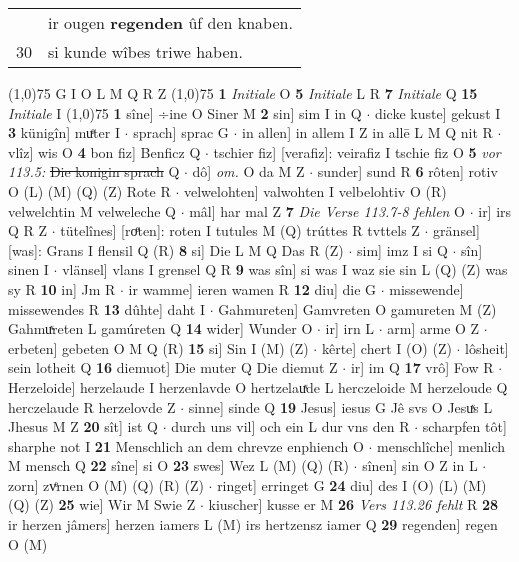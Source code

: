 \documentclass[8pt,a4paper,notitlepage]{article}
\begin{document}
\begin{table}[ht]
\begin{minipage}[t]{0.5\linewidth}
\begin{tabular}{rl}
 & ir ougen \textbf{regenden} ûf den knaben.\\ 
30 & si kunde wîbes triwe haben.\\ 
\end{tabular}
\scriptsize
\line(1,0){75} \newline
G I O L M Q R Z \newline
\line(1,0){75} \newline
\textbf{1} \textit{Initiale} O  \textbf{5} \textit{Initiale} L R  \textbf{7} \textit{Initiale} Q  \textbf{15} \textit{Initiale} I  \newline
\line(1,0){75} \newline
\textbf{1} sîne] ÷ine O Siner M \textbf{2} sin] sim I in Q  $\cdot$ dicke kuste] gekust I \textbf{3} künigîn] muͤter I  $\cdot$ sprach] sprac G  $\cdot$ in allen] in allem I Z in allē L M Q nit R  $\cdot$ vlîz] wis O \textbf{4} bon fiz] Benficz Q  $\cdot$ tschier fiz] [verafiz]: veirafiz I tschie fiz O \textbf{5} \textit{vor 113.5:} \sout{Die konigin sprach} Q   $\cdot$ dô] \textit{om.} O da M Z  $\cdot$ sunder] sund R \textbf{6} rôten] rotiv O (L) (M) (Q) (Z) Rote R  $\cdot$ velwelohten] valwohten I velbelohtiv O (R) velwelchtin M velweleche Q  $\cdot$ mâl] har mal Z \textbf{7} \textit{Die Verse 113.7-8 fehlen} O   $\cdot$ ir] irs Q R Z  $\cdot$ tütelînes] [roͤten]: roten I tutules M (Q) trúttes R tvttels Z  $\cdot$ gränsel] [was]: Grans I flensil Q (R) \textbf{8} si] Die L M Q Das R (Z)  $\cdot$ sim] imz I si Q  $\cdot$ sîn] sinen I  $\cdot$ vlänsel] vlans I grensel Q R \textbf{9} was sîn] si was I waz sie sin L (Q) (Z) was sy R \textbf{10} in] Jm R  $\cdot$ ir wamme] ieren wamen R \textbf{12} diu] die G  $\cdot$ missewende] missewendes R \textbf{13} dûhte] daht I  $\cdot$ Gahmureten] Gamvreten O gamureten M (Z) Gahmuͯreten L gamúreten Q \textbf{14} wider] Wunder O  $\cdot$ ir] irn L  $\cdot$ arm] arme O Z  $\cdot$ erbeten] gebeten O M Q (R) \textbf{15} si] Sin I (M) (Z)  $\cdot$ kêrte] chert I (O) (Z)  $\cdot$ lôsheit] sein lotheit Q \textbf{16} diemuot] Die muter Q Die diemut Z  $\cdot$ ir] im Q \textbf{17} vrô] Fow R  $\cdot$ Herzeloide] herzelaude I herzenlavde O hertzelauͯde L herczeloide M herzeloude Q herczelaude R herzelovde Z  $\cdot$ sinne] sinde Q \textbf{19} Jesus] iesus G Jê svs O Jesuͯs L Jhesus M Z \textbf{20} sît] ist Q  $\cdot$ durch uns vil] och ein L dur vns den R  $\cdot$ scharpfen tôt] sharphe not I \textbf{21} Menschlich an dem chrevze enphiench O  $\cdot$ menschlîche] menlich M mensch Q \textbf{22} sîne] si O \textbf{23} swes] Wez L (M) (Q) (R)  $\cdot$ sînen] sin O Z in L  $\cdot$ zorn] zvͤrnen O (M) (Q) (R) (Z)  $\cdot$ ringet] erringet G \textbf{24} diu] des I (O) (L) (M) (Q) (Z) \textbf{25} wie] Wir M Swie Z  $\cdot$ kiuscher] kusse er M \textbf{26} \textit{Vers 113.26 fehlt} R  \textbf{28} ir herzen jâmers] herzen iamers L (M) irs hertzensz iamer Q \textbf{29} regenden] regen O (M) \newline

\end{minipage}
\end{table}
\end{document}
